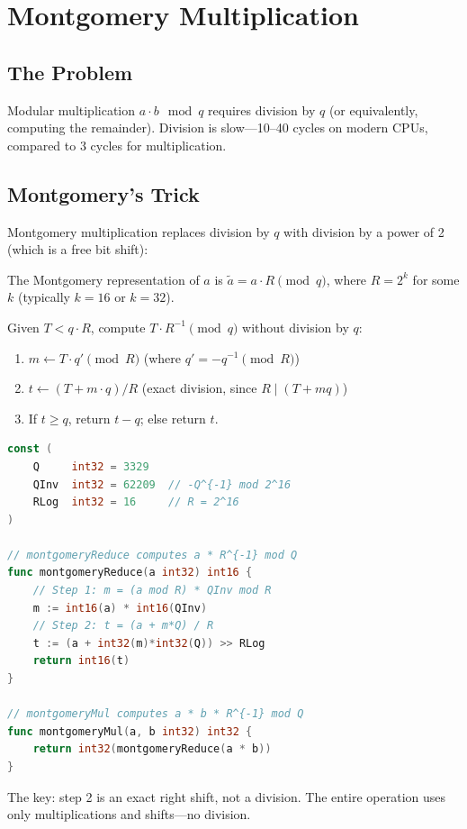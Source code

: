 \section{Montgomery Multiplication}


\subsection{The Problem}

Modular multiplication $a \cdot b \mod q$ requires division by $q$ (or equivalently,
computing the remainder). Division is slow---10--40 cycles on modern CPUs, compared to
3 cycles for multiplication.

\subsection{Montgomery's Trick}

Montgomery multiplication replaces division by $q$ with division by a power of 2 (which
is a free bit shift):

\begin{definition}
The Montgomery representation of $a$ is $\tilde{a} = a \cdot R \pmod{q}$, where
$R = 2^k$ for some $k$ (typically $k = 16$ or $k = 32$).
\end{definition}

\begin{definition}
Given $T < q \cdot R$, compute $T \cdot R^{-1} \pmod{q}$ without division by $q$:
\begin{enumerate}[nosep]
  \item $m \leftarrow T \cdot q' \pmod{R}$ \quad (where $q' = -q^{-1} \pmod{R}$)
  \item $t \leftarrow (T + m \cdot q) / R$ \quad (exact division, since $R \mid (T + mq)$)
  \item If $t \geq q$, return $t - q$; else return $t$.
\end{enumerate}
\end{definition}

\begin{lstlisting}[language=Go,caption={Montgomery multiplication for $q = 3329$}]
const (
    Q     int32 = 3329
    QInv  int32 = 62209  // -Q^{-1} mod 2^16
    RLog  int32 = 16     // R = 2^16
)

// montgomeryReduce computes a * R^{-1} mod Q
func montgomeryReduce(a int32) int16 {
    // Step 1: m = (a mod R) * QInv mod R
    m := int16(a) * int16(QInv)
    // Step 2: t = (a + m*Q) / R
    t := (a + int32(m)*int32(Q)) >> RLog
    return int16(t)
}

// montgomeryMul computes a * b * R^{-1} mod Q
func montgomeryMul(a, b int32) int32 {
    return int32(montgomeryReduce(a * b))
}
\end{lstlisting}

The key: step 2 is an exact right shift, not a division. The entire operation uses
only multiplications and shifts---no division.

